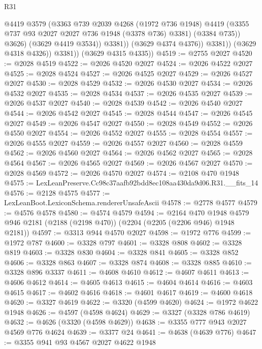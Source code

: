 \begin{lexlean}{R31}
\begin{coremodule}
                          @4419
                          @3579
                          (@3363
                            @739
                            @2039
                            @4268
                            (@1972 @736 @1948)
                            @4419
                            (@3355 @737 @93 @2027 @2027 @736 @1948 (@3378 @736) @3381)
                            (@3384 @735))
                          @3626)
                        (@3629 @4419 @3534))
                      @3381))
                  (@3629 @4374 @4376))
                @3381))
            (@3629 @4318 @4326))
          @3381))
      (@3629 @4315 @4335))
@4519 := @2755 @2027
@4520 := @2028 @4519
@4522 := @2026 @4520 @2027
@4524 := @2026 @4522 @2027
@4525 := @2028 @4524
@4527 := @2026 @4525 @2027
@4529 := @2026 @4527 @2027
@4530 := @2028 @4529
@4532 := @2026 @4530 @2027
@4534 := @2026 @4532 @2027
@4535 := @2028 @4534
@4537 := @2026 @4535 @2027
@4539 := @2026 @4537 @2027
@4540 := @2028 @4539
@4542 := @2026 @4540 @2027
@4544 := @2026 @4542 @2027
@4545 := @2028 @4544
@4547 := @2026 @4545 @2027
@4549 := @2026 @4547 @2027
@4550 := @2028 @4549
@4552 := @2026 @4550 @2027
@4554 := @2026 @4552 @2027
@4555 := @2028 @4554
@4557 := @2026 @4555 @2027
@4559 := @2026 @4557 @2027
@4560 := @2028 @4559
@4562 := @2026 @4560 @2027
@4564 := @2026 @4562 @2027
@4565 := @2028 @4564
@4567 := @2026 @4565 @2027
@4569 := @2026 @4567 @2027
@4570 := @2028 @4569
@4572 := @2026 @4570 @2027
@4574 := @2108 @470 @1948
@4575 := LexLeanPreserve.Cc98c37aafb92bdd8ec108aa430da9d06.R31.__fits_14
@4576 := @2128 @4575
@4577 := LexLeanBoot.LexiconSchema.rendererUnsafeAscii
@4578 := @2778 @4577
@4579 := @4576 @4578
@4580 := @4574 @4579
@4594 := @2164
    @470
    @1948
    @4579
    @946
    @2181
    (@2188 (@2198 @470))
    (@2204 (@2205 (@2206 @946) @1948 @2181))
@4597 := @3313 @944 @4570 @2027
@4598 := @1972 @776
@4599 := @1972 @787
@4600 := @3328 @797
@4601 := @3328 @808
@4602 := @3328 @819
@4603 := @3328 @830
@4604 := @3328 @841
@4605 := @3328 @852
@4606 := @3328 @863
@4607 := @3328 @874
@4608 := @3328 @885
@4610 := @3328 @896 @3337
@4611 := @4608 @4610
@4612 := @4607 @4611
@4613 := @4606 @4612
@4614 := @4605 @4613
@4615 := @4604 @4614
@4616 := @4603 @4615
@4617 := @4602 @4616
@4618 := @4601 @4617
@4619 := @4600 @4618
@4620 := @3327 @4619
@4622 := @3320 (@4599 @4620)
@4624 := @1972 @4622 @1948
@4626 := @4597 (@4598 @4624)
@4629 := @3327 (@3328 @786 @4619)
@4632 := @4626 (@3320 (@4598 @4629))
@4638 := @3355 @777 @943 @2027 @4569 @776 @4624
@4639 := @3377 @24
@4641 := @4638 (@4639 @776)
@4647 := @3355 @941 @93 @4567 @2027 @4622 @1948

\end{coremodule}
\end{lexlean}

